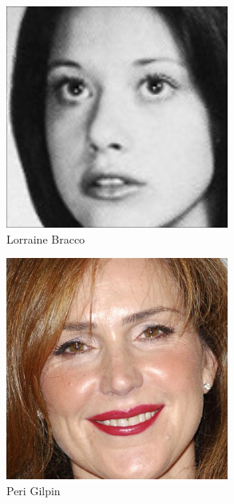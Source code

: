 \documentclass{article}
\begin{document}
\begin{figure}
	\begin{subfigure}{0.5\linewidth}
		\centering
		\includegraphics[width=0.75\linewidth]{most_bracco}
		\caption{Lorraine Bracco}
	\end{subfigure}%
	\begin{subfigure}{0.5\linewidth}
		\centering
		\includegraphics[width=0.75\linewidth]{most_gilpin}
		\caption{Peri Gilpin}
	\end{subfigure}\vspace{1em}
	\begin{subfigure}{0.5\linewidth}
		\centering

\end{subfigure}
\end{figure}
\end{document}
